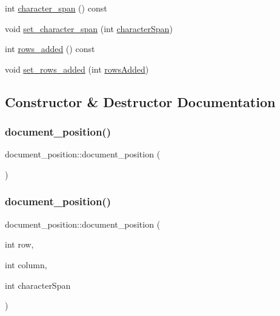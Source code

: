 \begin{DoxyCompactItemize}
\item 
int \mbox{\hyperlink{structdocument__position_a746229eaedf6aa8dec07dad7a4117590}{character\+\_\+span}} () const
\item 
void \mbox{\hyperlink{structdocument__position_aa83b6505abfd4a91083fc6627e6dbb86}{set\+\_\+character\+\_\+span}} (int \mbox{\hyperlink{structdocument__position_a422c8ccb286da776adfe23ac30a65cc4}{character\+Span}})
\item 
int \mbox{\hyperlink{structdocument__position_aac6e8273ee916e655827f19865615819}{rows\+\_\+added}} () const
\item 
void \mbox{\hyperlink{structdocument__position_a111bf7ce23a7f596feb7ac250199f780}{set\+\_\+rows\+\_\+added}} (int \mbox{\hyperlink{structdocument__position_ae2d90039ea04e702006f0fa2748b3959}{rows\+Added}})
\end{DoxyCompactItemize}


\subsection{Constructor \& Destructor Documentation}
\mbox{\label{structdocument__position_ae82af8b236dbaf8f4d9d3ca4f346cf14}} 
\subsubsection{\texorpdfstring{document\_position()}{document\_position()}\hspace{0.1cm}{\footnotesize\ttfamily [1/3]}}
{\footnotesize\ttfamily document\+\_\+position\+::document\+\_\+position (\begin{DoxyParamCaption}{ }\end{DoxyParamCaption})\hspace{0.3cm}{\ttfamily [inline]}}

\mbox{\label{structdocument__position_a35caaae8bd7652358dc56a09503d252e}} 
\subsubsection{\texorpdfstring{document\_position()}{document\_position()}\hspace{0.1cm}{\footnotesize\ttfamily [2/3]}}
{\footnotesize\ttfamily document\+\_\+position\+::document\+\_\+position (\begin{DoxyParamCaption}\item[{int}]{row,  }\item[{int}]{column,  }\item[{int}]{character\+Span }\end{DoxyParamCaption})\hspace{0.3cm}{\ttfamily [inline]}}


